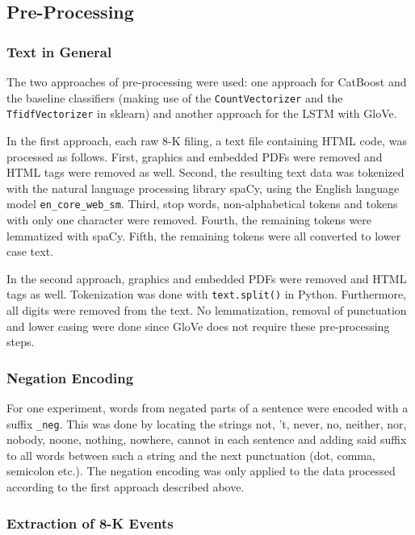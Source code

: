 \documentclass{article}
\begin{document}
	\subsection{Pre-Processing}
	
	\subsubsection{Text in General}
	
	The two approaches of pre-processing were used: one approach for CatBoost and the baseline classifiers (making use of the \lstinline{CountVectorizer} and the \lstinline{TfidfVectorizer} in sklearn) and another approach for the LSTM with GloVe.
	
	In the first approach, each raw 8-K filing, a text file containing HTML code, was processed as follows. First, graphics and embedded PDFs were removed and HTML tags were removed as well. Second, the resulting text data was tokenized with the natural language processing library spaCy, using the English language model \lstinline{en_core_web_sm}. Third, stop words, non-alphabetical tokens and tokens with only one character were removed. Fourth, the remaining tokens were lemmatized with spaCy. Fifth, the remaining tokens were all converted to lower case text.
	
	In the second approach, graphics and embedded PDFs were removed and HTML tags as well. Tokenization was done with \lstinline{text.split()} in Python. Furthermore, all digits were removed from the text. No lemmatization, removal of punctuation and lower casing were done since GloVe does not require these pre-processing steps.
	
	\subsubsection{Negation Encoding}
	
	For one experiment, words from negated parts of a sentence were encoded with a suffix \lstinline{_neg}. This was done by locating the strings not, 't, never, no, neither, nor, nobody, noone, nothing, nowhere, cannot in each sentence and adding said suffix to all words between such a string and the next punctuation (dot, comma, semicolon etc.). The negation encoding was only applied to the data processed according to the first approach described above.
	
	\subsubsection{Extraction of 8-K Events}
	
\end{document}
